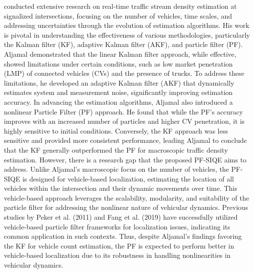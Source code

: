 \textcite{aljamal2020real} conducted extensive research on real-time traffic stream density estimation at signalized intersections, focusing on the number of vehicles, time scales, and addressing uncertainties through the evolution of estimation algorithms. His work is pivotal in understanding the effectiveness of various methodologies, particularly the Kalman filter (KF), adaptive Kalman filter (AKF), and particle filter (PF). Aljamal demonstrated that the linear Kalman filter approach, while effective, showed limitations under certain conditions, such as low market penetration (LMP) of connected vehicles (CVs) and the presence of trucks. To address these limitations, he developed an adaptive Kalman filter (AKF) that dynamically estimates system and measurement noise, significantly improving estimation accuracy. In advancing the estimation algorithms, Aljamal also introduced a nonlinear Particle Filter (PF) approach. He found that while the PF's accuracy improves with an increased number of particles and higher CV penetration, it is highly sensitive to initial conditions. Conversely, the KF approach was less sensitive and provided more consistent performance, leading Aljamal to conclude that the KF generally outperformed the PF for macroscopic traffic density estimation. However, there is a research gap that the proposed PF-SIQE aims to address. Unlike Aljamal’s macroscopic focus on the number of vehicles, the PF-SIQE is designed for vehicle-based localization, estimating the location of all vehicles within the intersection and their dynamic movements over time. This vehicle-based approach leverages the scalability, modularity, and suitability of the particle filter for addressing the nonlinear nature of vehicular dynamics. Previous studies by Peker et al. (2011) and Fang et al. (2019) have successfully utilized vehicle-based particle filter frameworks for localization issues, indicating its common application in such contexts. Thus, despite Aljamal's findings favoring the KF for vehicle count estimation, the PF is expected to perform better in vehicle-based localization due to its robustness in handling nonlinearities in vehicular dynamics.

